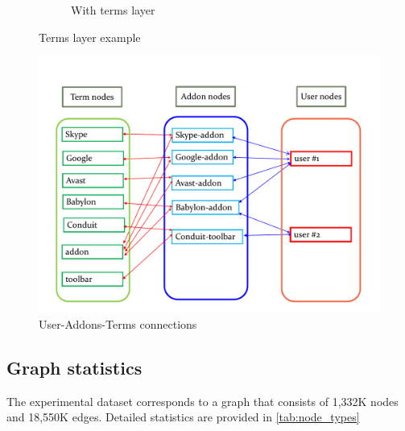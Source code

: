 \documentclass[ijoc,nonblindrev]{informs3} %
\numberwithin{equation}{subsection}
\begin{document}
\begin{figure}[t]
\begin{subfigure}[b]{0.49\textwidth}
	\caption{With terms layer}
\end{subfigure}
	\caption{Terms layer example}
	\label{fig:terms_layer}
\end{figure}

\begin{figure}[!htbp]
\centering
\begin{small}
\includegraphics[width=\textwidth]{figures/symbolic_graph.pdf}
\end{small}
\caption{User-Addons-Terms connections}
\label{fig:symbolic_graph}
\end{figure}

\subsection{Graph statistics}

The experimental dataset corresponds to a graph that consists of 1,332K nodes and 18,550K edges. Detailed statistics are provided in \autoref{tab:node_types}
\end{document}
